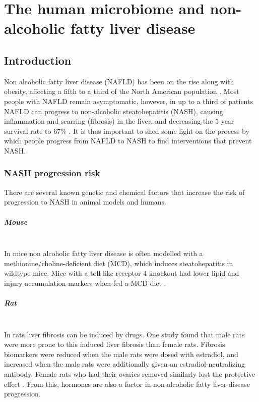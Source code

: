 \chapter{The human microbiome and non-alcoholic fatty liver disease}

\section{Introduction}
Non alcoholic fatty liver disease (NAFLD) has been on the rise along with obesity, affecting a fifth to a third of the North American population \cite{preiss2008non}. Most people with NAFLD remain asymptomatic, however, in up to a third of patients NAFLD can progress to non-alcoholic steatohepatitis (NASH), causing inflammation and scarring (fibrosis) in the liver, and decreasing the 5 year survival rate to 67\% \cite{propst1995prognosis}. It is thus important to shed some light on the process by which people progress from NAFLD to NASH to find interventions that prevent NASH.

\subsection{NASH progression risk}
There are several known genetic and chemical factors that increase the risk of progression to NASH in animal models and humans.

\paragraph{Mouse}\mbox{}\\
In mice non alcoholic fatty liver disease is often modelled with a methionine/choline-deficient diet (MCD), which induces steatohepatitis in wildtype mice. Mice with a toll-like receptor 4 knockout had lower lipid and injury accumulation markers when fed a MCD diet \cite{rivera2007toll}.

\paragraph{Rat}\mbox{}\\
In rats liver fibrosis can be induced by drugs. One study found that male rats were more prone to this induced liver fibrosis than female rats. Fibrosis biomarkers were reduced when the male rats were dosed with estradiol, and increased when the male rats were additionally given an estradiol-neutralizing antibody. Female rats who had their ovaries removed similarly lost the protective effect \cite{yasuda1999suppressive}. From this, hormones are also a factor in non-alcoholic fatty liver disease progression.


